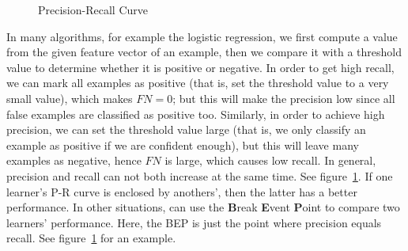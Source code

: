 \begin{figure}[ht]
    \begin{center}
    \end{center}
    \caption{Precision-Recall Curve}\label{pr_curve}
\end{figure}
In many algorithms, for example the logistic regression, we first compute a value from the given feature
vector of an example, then we compare it
with a threshold value to determine whether it is positive or negative. In order to get high recall, we can
mark all examples as positive (that is, set the threshold value to a very small value), which makes $FN = 0$;
but this will make the precision low since all false examples are classified as positive too.
Similarly, in order to achieve high precision, we can set the threshold value large (that is, we only classify
an example as positive if we are confident enough), but this will leave many examples as negative, hence $FN$
is large, which causes low recall. In general, precision and recall can not both increase at the same time.
See figure~\ref{pr_curve}. If one
learner's P-R curve is enclosed  by anothers', then the latter has a better performance. In other situations,
can use the \textbf{B}reak \textbf{E}vent \textbf{P}oint to compare two learners' performance. Here, the BEP
is just the point where precision equals recall. See figure~\ref{pr_curve} for an example.

